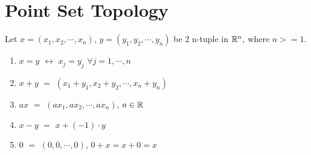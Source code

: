 \documentclass {article}
\begin{document}
\section {Point Set Topology}
	Let $x=(x_1, x_2, \cdots , x_n)$, $y=(y_1, y_2, \cdots , y_n)$ be 2 n-tuple in $\Bbb R^n,$ where $n>=1$.
	\begin {enumerate}
		\item {$x=y$ $\leftrightarrow$ $x_j=y_j$ $\forall j=1,\cdots,n$}
		\item {$x+y$ $=$ $(x_1+y_1, x_2+y_2,\cdots,x_n+y_n)$}
		\item {$ax$ $=$ $(ax_1, ax_2,\cdots,ax_n)$, $a\in \Bbb R$}
		\item {$x-y$ $=$ $x+(-1)\cdot y$}
		\item {$0$ $=$ $(0,0,\cdots,0)$, $0+x=x+0=x$}
	\end {enumerate}
\end{document}
